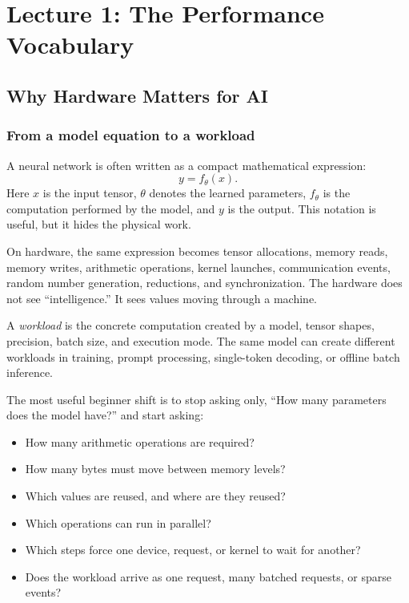 \section{Lecture 1: The Performance Vocabulary}

\subsection{Why Hardware Matters for AI}

\subsubsection{From a model equation to a workload}

A neural network is often written as a compact mathematical expression:
\[
  y = f_\theta(x).
\]
Here \(x\) is the input tensor, \(\theta\) denotes the learned parameters, \(f_\theta\) is the computation performed by the model, and \(y\) is the output. This notation is useful, but it hides the physical work.

On hardware, the same expression becomes tensor allocations, memory reads, memory writes, arithmetic operations, kernel launches, communication events, random number generation, reductions, and synchronization. The hardware does not see ``intelligence.'' It sees values moving through a machine.

A \emph{workload} is the concrete computation created by a model, tensor shapes, precision, batch size, and execution mode. The same model can create different workloads in training, prompt processing, single-token decoding, or offline batch inference.

The most useful beginner shift is to stop asking only, ``How many parameters does the model have?'' and start asking:

\begin{itemize}[leftmargin=*]
  \item How many arithmetic operations are required?
  \item How many bytes must move between memory levels?
  \item Which values are reused, and where are they reused?
  \item Which operations can run in parallel?
  \item Which steps force one device, request, or kernel to wait for another?
  \item Does the workload arrive as one request, many batched requests, or sparse events?
\end{itemize}

